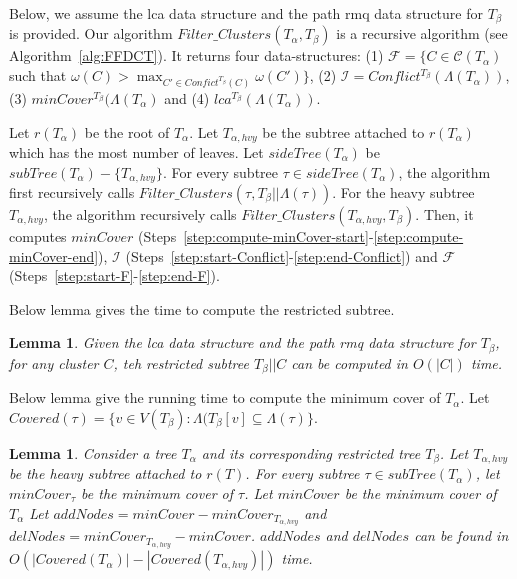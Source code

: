 \documentclass[final,1p,times]{elsarticle}
\newcommand{\weight}{\omega}
\newcommand{\TA}{T_\alpha}
\newcommand{\TB}{T_\beta}
\newtheorem{lemma}[theorem]{Lemma}
\begin{document}
    Below, we assume the lca data structure and the path rmq data structure for $T_{\beta}$ is provided.
    Our algorithm $Filter\_Clusters(T_{\alpha}, T_{\beta})$ is a recursive algorithm (see Algorithm~\ref{alg:FFDCT}).
    It returns four data-structures: (1) $\mathcal{F} = \{ C \in \mathcal{C}(\TA)$ such that $\weight(C) > \max_{C' \in Confict^{\TB}(C)} \weight(C') \}$,
    (2) $\mathcal{I} = Conflict^{\TB}(\Lambda(\TA))$,
    (3) $minCover^{T_{\beta}}(\Lambda(T_{\alpha})$ and (4) $lca^{T_{\beta}}(\Lambda(\TA))$.

    Let $r(T_{\alpha})$ be the root of $T_{\alpha}$. Let $T_{\alpha,hvy}$ be the subtree attached to $r(T_{\alpha})$ which has the most number of leaves.
    Let $sideTree(T_{\alpha})$ be $subTree(T_{\alpha}) - \{ T_{\alpha,hvy} \}$.
    For every subtree $\tau \in sideTree(T_{\alpha})$, the algorithm first recursively calls $Filter\_Clusters(\tau, T_{\beta}||\Lambda(\tau))$.
    For the heavy subtree $T_{\alpha,hvy}$, the algorithm recursively calls $Filter\_Clusters(T_{\alpha,hvy}, T_{\beta})$.
    Then, it computes $minCover$ (Steps~\ref{step:compute-minCover-start}-\ref{step:compute-minCover-end}), $\mathcal{I}$ (Steps~\ref{step:start-Conflict}-\ref{step:end-Conflict}) and $\mathcal{F}$ (Steps~\ref{step:start-F}-\ref{step:end-F}).

    Below lemma gives the time to compute the restricted subtree.
    \begin{lemma}
	    Given the lca data structure and the path rmq data structure for $T_{\beta}$,
	    for any cluster $C$, teh restricted subtree $T_{\beta}||C$ can be computed in $O(|C|)$ time.
    \end{lemma}

    Below lemma give the running time to compute the minimum cover of $T_{\alpha}$.
    Let $Covered(\tau) = \{ v \in V(T_{\beta}) : \Lambda(T_{\beta}[v] \subseteq \Lambda(\tau) \}$.
    \begin{lemma}
	    Consider a tree $T_{\alpha}$ and its corresponding restricted tree $T_{\beta}$. Let $T_{\alpha,hvy}$ be the heavy subtree attached to $r(T)$.
	    For every subtree $\tau \in subTree(T_{\alpha})$, let $minCover_{\tau}$ be the minimum cover of $\tau$.
	    Let $minCover$ be the minimum cover of $T_{\alpha}$
	    Let $addNodes = minCover - minCover_{T_{\alpha,hvy}}$ and $delNodes = minCover_{T_{\alpha,hvy}} - minCover$.
	    $addNodes$ and $delNodes$ can be found in $O(|Covered(T_{\alpha})| - |Covered(T_{\alpha,hvy})|)$ time.
    \end{lemma}
\end{document}
